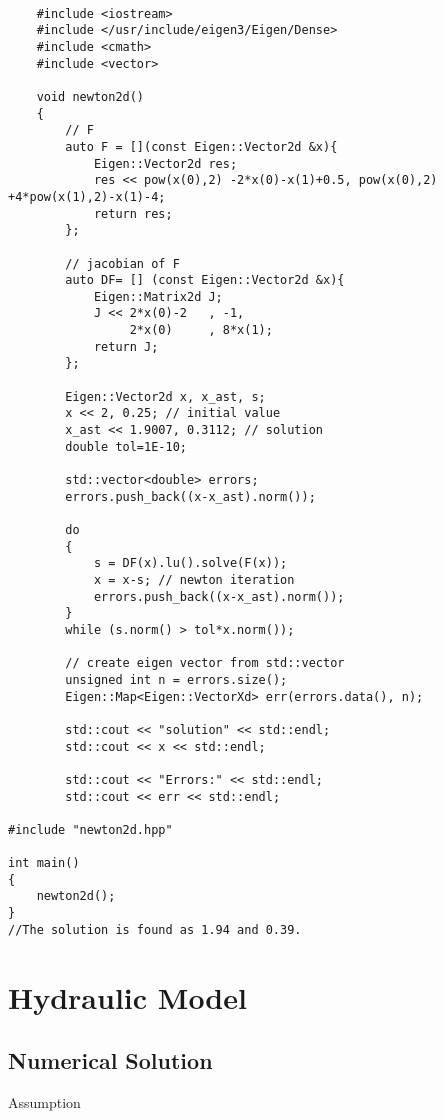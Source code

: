 \documentclass[xcolor=dvipsnames]{beamer}
\begin{document}
{
\begin{frame}[fragile,shrink=30]
	\lstset{language=C++}
\begin{lstlisting}

	#include <iostream>
	#include </usr/include/eigen3/Eigen/Dense>
	#include <cmath>
	#include <vector>

	void newton2d()
	{
		// F
		auto F = [](const Eigen::Vector2d &x){ 
	   		Eigen::Vector2d res;
			res << pow(x(0),2) -2*x(0)-x(1)+0.5, pow(x(0),2) +4*pow(x(1),2)-x(1)-4;
			return res;
		};

		// jacobian of F
		auto DF= [] (const Eigen::Vector2d &x){
			Eigen::Matrix2d J;
			J << 2*x(0)-2	, -1, 
			  	 2*x(0)		, 8*x(1);
		  	return J;
		};	

		Eigen::Vector2d x, x_ast, s;
		x << 2, 0.25; // initial value
		x_ast << 1.9007, 0.3112; // solution
	   	double tol=1E-10;

		std::vector<double> errors;
		errors.push_back((x-x_ast).norm());

		do
		{
			s = DF(x).lu().solve(F(x));
		   	x = x-s; // newton iteration
			errors.push_back((x-x_ast).norm());
		}
		while (s.norm() > tol*x.norm());

		// create eigen vector from std::vector
		unsigned int n = errors.size();
		Eigen::Map<Eigen::VectorXd> err(errors.data(), n);

		std::cout << "solution" << std::endl;
		std::cout << x << std::endl;
		
		std::cout << "Errors:" << std::endl;
		std::cout << err << std::endl;

#include "newton2d.hpp"
  
int main()
{
	newton2d();
}
//The solution is found as 1.94 and 0.39.
\end{lstlisting}
\end{frame}

\section{Hydraulic Model}

\subsection{Numerical Solution}
\begin{frame}{Assumption}


\end{frame}}
\end{document}
